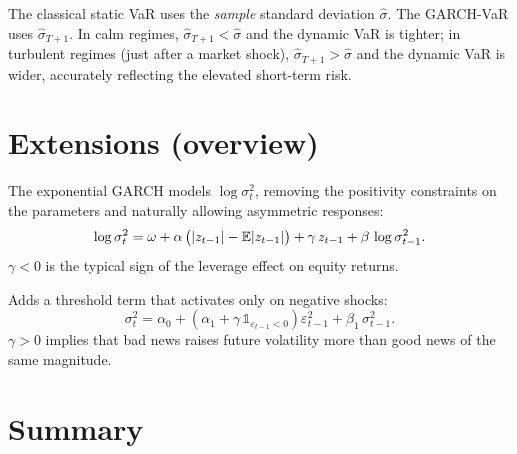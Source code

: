 \begin{rembox}
The classical static VaR uses the \emph{sample} standard deviation
$\widehat\sigma$. The GARCH-VaR uses
$\widehat\sigma_{T+1}$. In calm regimes, $\widehat\sigma_{T+1} <
\widehat\sigma$ and the dynamic VaR is tighter; in turbulent
regimes (just after a market shock), $\widehat\sigma_{T+1} >
\widehat\sigma$ and the dynamic VaR is wider, accurately reflecting
the elevated short-term risk.
\end{rembox}

\section{Extensions (overview)}
\label{sec:extensions}

\begin{rembox}
The exponential GARCH models $\log \sigma_t^2$, removing the
positivity constraints on the parameters and naturally allowing
asymmetric responses:
\[
  \log \sigma_t^2
  = \omega + \alpha\, \bigl(|z_{t-1}| - \mathbb{E} |z_{t-1}|\bigr)
          + \gamma\, z_{t-1}
          + \beta\, \log \sigma_{t-1}^2.
\]
$\gamma < 0$ is the typical sign of the leverage effect on equity
returns.
\end{rembox}

\begin{rembox}
Adds a threshold term that activates only on negative shocks:
\[
  \sigma_t^2
  = \alpha_0
  + (\alpha_1 + \gamma\, \mathbb 1_{\varepsilon_{t-1} < 0})
       \varepsilon_{t-1}^2
  + \beta_1\, \sigma_{t-1}^2.
\]
$\gamma > 0$ implies that bad news raises future volatility more
than good news of the same magnitude.
\end{rembox}

\section*{Summary}

